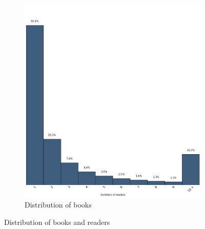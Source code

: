 \documentclass[11pt]{article}
\begin{document}
\begin{figure}[ht]
\begin{subfigure}[b]{0.5\textwidth}
                \includegraphics[width=\textwidth]{images/books}
                \caption{Distribution of books}
                \label{fig:books_books_read}
        \end{subfigure}
        \caption{Distribution of books and readers}
\end{figure}




\end{document}
